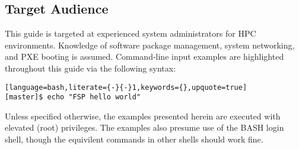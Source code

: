 \subsection{Target Audience}

This guide is targeted at experienced \Linux{} system administrators for HPC
environments. Knowledge of software package management, system networking, and
PXE booting is assumed.  Command-line input examples are highlighted throughout
this guide via the following syntax:

\begin{lstlisting}[language=bash,literate={-}{-}1,keywords={},upquote=true]
[master]$ echo "FSP hello world"
\end{lstlisting}

Unless specified otherwise, the examples presented herein are executed with
elevated (root) privileges. The examples also presume use of the BASH login
shell, though the equivilent commands in other shells should work fine.
